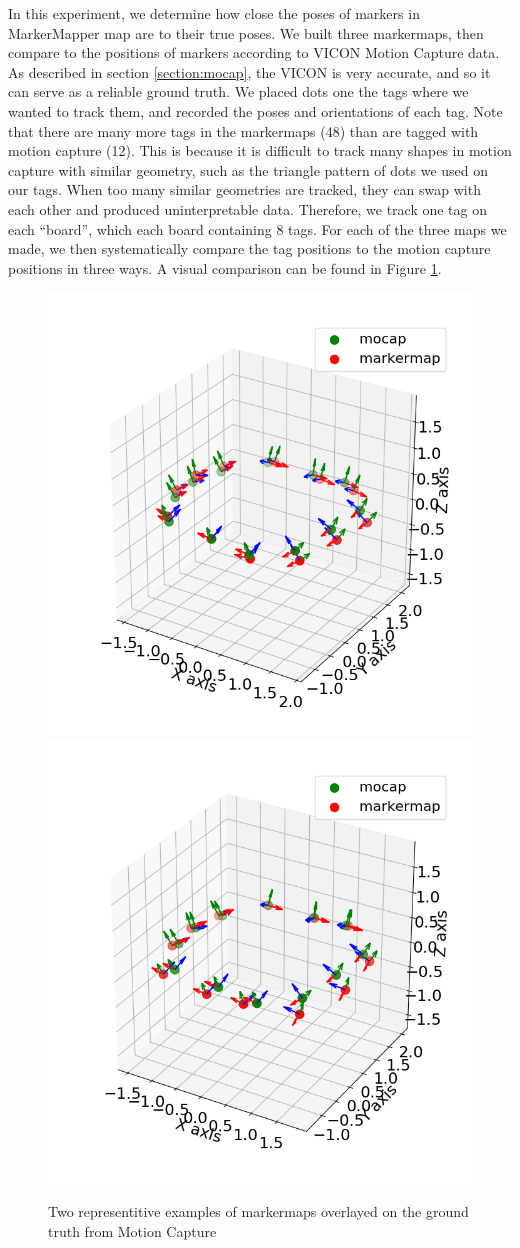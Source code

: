 \documentclass{article}
\begin{document}
    In this experiment, we determine how close the poses of markers in MarkerMapper map are to their true poses. We built three markermaps, then compare to the positions of markers according to VICON Motion Capture data. As described in section \ref{section:mocap}, the VICON is very accurate, and so it can serve as a reliable ground truth. We placed dots one the tags where we wanted to track them, and recorded the poses and orientations of each tag. Note that there are many more tags in the markermaps (48) than are tagged with motion capture (12). This is because it is difficult to track many shapes in motion capture with similar geometry, such as the triangle pattern of dots we used on our tags. When too many similar geometries are tracked, they can swap with each other and produced uninterpretable data. Therefore, we track one tag on each ``board'', which each board containing 8 tags. For each of the three maps we made, we then systematically compare the tag positions to the motion capture positions in three ways. A visual comparison can be found in Figure \ref{fig:benchmarking_markermapper}.

    \begin{figure}[H]
      \centering
      \includegraphics[width=0.49\linewidth]{./images/benchmarking_markermapper.png}
      \includegraphics[width=0.49\linewidth]{./images/benchmarking_markermapper_alt.png}
      \caption{Two representitive examples of markermaps overlayed on the ground truth from Motion Capture}
      \label{fig:benchmarking_markermapper}
    \end{figure}
\end{document}
